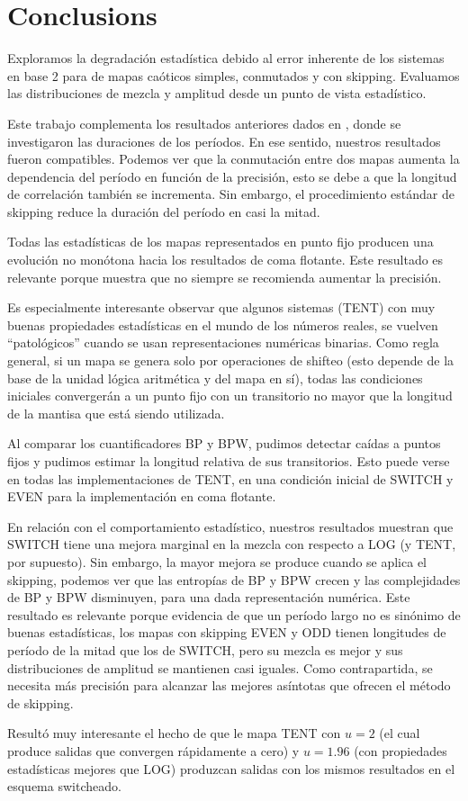 \section{Conclusions}\label{sec:conclusions}

Exploramos la degradación estadística debido al error inherente de los sistemas en base 2 para de mapas caóticos simples, conmutados y con skipping.
Evaluamos las distribuciones de mezcla y amplitud desde un punto de vista estadístico.

Este trabajo complementa los resultados anteriores dados en \cite{Nagaraj2008}, donde se investigaron las duraciones de los períodos.
En ese sentido, nuestros resultados fueron compatibles.
Podemos ver que la conmutación entre dos mapas aumenta la dependencia del período en función de la precisión, esto se debe a que la longitud de correlación también se incrementa.
Sin embargo, el procedimiento estándar de skipping reduce la duración del período en casi la mitad.

Todas las estadísticas de los mapas representados en punto fijo producen una evolución no monótona hacia los resultados de coma flotante.
Este resultado es relevante porque muestra que no siempre se recomienda aumentar la precisión.

Es especialmente interesante observar que algunos sistemas (TENT) con muy buenas propiedades estadísticas en el mundo de los números reales, se vuelven ``patológicos'' cuando se usan representaciones numéricas binarias.
Como regla general, si un mapa se genera solo por operaciones de shifteo (esto depende de la base de la unidad lógica aritmética y del mapa en sí), todas las condiciones iniciales convergerán a un punto fijo con un transitorio no mayor que la longitud de la mantisa que está siendo utilizada.

Al comparar los cuantificadores BP y BPW, pudimos detectar caídas a puntos fijos y pudimos estimar la longitud relativa de sus transitorios.
Esto puede verse en todas las implementaciones de TENT, en una condición inicial de SWITCH y EVEN para la implementación en coma flotante.

En relación con el comportamiento estadístico, nuestros resultados muestran que SWITCH tiene una mejora marginal en la mezcla con respecto a LOG (y TENT, por supuesto).
Sin embargo, la mayor mejora se produce cuando se aplica el skipping, podemos ver que las entropías de BP y BPW crecen y las complejidades de BP y BPW disminuyen, para una dada representación numérica.
Este resultado es relevante porque evidencia de que un período largo no es sinónimo de buenas estadísticas, los mapas con skipping EVEN y ODD tienen longitudes de período de la mitad que los de SWITCH, pero su mezcla es mejor y sus distribuciones de amplitud se mantienen casi iguales.
Como contrapartida, se necesita más precisión para alcanzar las mejores asíntotas que ofrecen el método de skipping.

Resultó muy interesante el hecho de que le mapa TENT con $u=2$ (el cual produce salidas que convergen rápidamente a cero) y $u=1.96$ (con propiedades estadísticas mejores que LOG) produzcan salidas con los mismos resultados en el esquema switcheado.